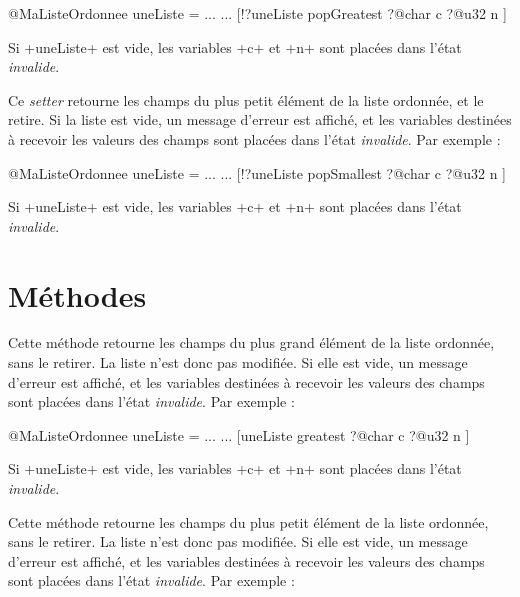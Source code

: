 \begin{galgas4}
@MaListeOrdonnee uneListe = ...
...
[!?uneListe popGreatest
  ?@char c
  ?@u32 n
]
\end{galgas4}

Si \ggsq+uneListe+ est vide, les variables \ggsq+c+ et \ggsq+n+ sont placées dans l'état \emph{invalide}.



Ce \emph{setter} retourne les champs du plus petit élément de la liste ordonnée, et le retire. Si la liste est vide, un message d'erreur est affiché, et les variables destinées à recevoir les valeurs des champs sont placées dans l'état \emph{invalide}. Par exemple :

\begin{galgas4}
@MaListeOrdonnee uneListe = ...
...
[!?uneListe popSmallest
  ?@char c
  ?@u32 n
]
\end{galgas4}

Si \ggsq+uneListe+ est vide, les variables \ggsq+c+ et \ggsq+n+ sont placées dans l'état \emph{invalide}.










\section{Méthodes}


Cette méthode retourne les champs du plus grand élément de la liste ordonnée, sans le retirer. La liste n'est donc pas modifiée. Si elle est vide, un message d'erreur est affiché, et les variables destinées à recevoir les valeurs des champs sont placées dans l'état \emph{invalide}. Par exemple :

\begin{galgas4}
@MaListeOrdonnee uneListe = ...
...
[uneListe greatest
  ?@char c
  ?@u32 n
]
\end{galgas4}

Si \ggsq+uneListe+ est vide, les variables \ggsq+c+ et \ggsq+n+ sont placées dans l'état \emph{invalide}.



Cette méthode retourne les champs du plus petit élément de la liste ordonnée, sans le retirer. La liste n'est donc pas modifiée. Si elle est vide, un message d'erreur est affiché, et les variables destinées à recevoir les valeurs des champs sont placées dans l'état \emph{invalide}. Par exemple :

